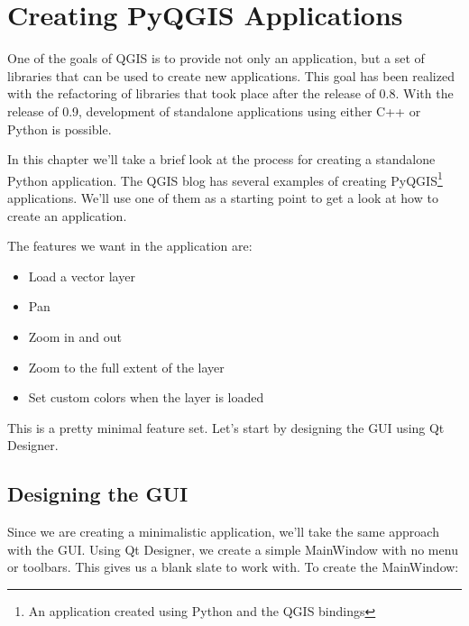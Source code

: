 
\section{Creating PyQGIS Applications}

\updatedisclaimer

One of the goals of QGIS is to provide not only an application, but a set of
libraries that can be used to create new applications. This goal has been
realized with the refactoring of libraries that took place after the release of
0.8. With the release of 0.9, development of standalone
applications using either C++ or Python is possible.

In this chapter we'll take a brief look at the process for creating a standalone
Python application. The QGIS blog has several examples of creating
PyQGIS\footnote{An application created using Python and the QGIS bindings}
applications. We'll use one of them as a starting point to get a look at how to
create an application.

The features we want in the application are:

\begin{itemize}
\item Load a vector layer
\item Pan
\item Zoom in and out
\item Zoom to the full extent of the layer
\item Set custom colors when the layer is loaded
\end{itemize} 

This is a pretty minimal feature set. Let's start by designing the GUI using
Qt Designer. 

\subsection{Designing the GUI}

Since we are creating a minimalistic application, we'll take the same
approach with the GUI. Using Qt Designer, we create a simple MainWindow with
no menu or toolbars. This gives us a blank slate to work with. To create the
MainWindow:

